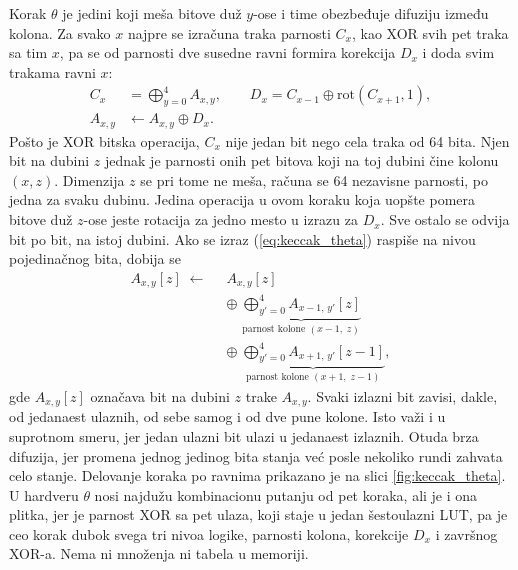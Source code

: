Korak $\theta$ je jedini koji meša bitove duž $y$-ose i time obezbeđuje difuziju između kolona. Za svako $x$ najpre se izračuna traka parnosti $C_x$, kao XOR svih pet traka sa tim $x$, pa se od parnosti dve susedne ravni formira korekcija $D_x$ i doda svim trakama ravni $x$:
\begin{align}
    C_x &= \bigoplus_{y=0}^{4} A_{x,y}, \qquad D_x = C_{x-1} \oplus \mathrm{rot}(C_{x+1}, 1), \nonumber\\
    A_{x,y} &\gets A_{x,y} \oplus D_x.
    \label{eq:keccak_theta}
\end{align}
Pošto je XOR bitska operacija, $C_x$ nije jedan bit nego cela traka od 64 bita. Njen bit na dubini $z$ jednak je parnosti onih pet bitova koji na toj dubini čine kolonu $(x,z)$. Dimenzija $z$ se pri tome ne meša, računa se 64 nezavisne parnosti, po jedna za svaku dubinu. Jedina operacija u ovom koraku koja uopšte pomera bitove duž $z$-ose jeste rotacija za jedno mesto u izrazu za $D_x$. Sve ostalo se odvija bit po bit, na istoj dubini.
\smallbreak
Ako se izraz (\ref{eq:keccak_theta}) raspiše na nivou pojedinačnog bita, dobija se
\begin{align}
    A_{x,y}[z] \;\gets\;\; & A_{x,y}[z] \nonumber\\[0.4ex]
    &\oplus\; \underbrace{\bigoplus_{y'=0}^{4} A_{x-1,\,y'}[z]}_{\text{parnost kolone } (x-1,\;z)} \nonumber\\[0.4ex]
    &\oplus\; \underbrace{\bigoplus_{y'=0}^{4} A_{x+1,\,y'}[z-1]}_{\text{parnost kolone } (x+1,\;z-1)},
\end{align}
gde $A_{x,y}[z]$ označava bit na dubini $z$ trake $A_{x,y}$.
Svaki izlazni bit zavisi, dakle, od jedanaest ulaznih, od sebe samog i od dve pune kolone. Isto važi i u suprotnom smeru, jer jedan ulazni bit ulazi u jedanaest izlaznih. Otuda brza difuzija, jer promena jednog jedinog bita stanja već posle nekoliko rundi zahvata celo stanje. Delovanje koraka po ravnima prikazano je na slici \ref{fig:keccak_theta}.
\smallbreak
U hardveru $\theta$ nosi najdužu kombinacionu putanju od pet koraka, ali je i ona plitka, jer je parnost XOR sa pet ulaza, koji staje u jedan šestoulazni LUT, pa je ceo korak dubok svega tri nivoa logike, parnosti kolona, korekcije $D_x$ i završnog XOR-a. Nema ni množenja ni tabela u memoriji.

